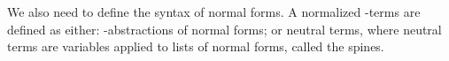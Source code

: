 \begin{code}[hide]%
\>[0]\AgdaSpace{}%
\AgdaSpace{}%
\AgdaSpace{}%
\AgdaSymbol{:}\AgdaSpace{}%
\AgdaSpace{}%
\AgdaSpace{}%
\<%
\end{code}

We also need to define the syntax of normal forms. A normalized \lambda-terms are defined as either: \lambda-abstractions of normal forms; or neutral terms, where neutral terms are variables applied to lists of normal forms, called the spines.

\begin{code}%
\>[0]\<%
\\
\>[0][@{}l@{\AgdaIndent{0}}]%
\>[2]\AgdaSpace{}%
\AgdaSpace{}%
\AgdaSymbol{:}\AgdaSpace{}%
\AgdaSpace{}%
\AgdaSpace{}%
\AgdaSpace{}%
\AgdaSpace{}%
\AgdaSpace{}%
\<%
\\
\>[2][@{}l@{\AgdaIndent{0}}]%
\>[4]\AgdaSpace{}%
\AgdaSymbol{:}\AgdaSpace{}%
\AgdaSpace{}%
\AgdaSymbol{(}\AgdaSpace{}%
\AgdaSpace{}%
\AgdaSymbol{)}\AgdaSpace{}%
\AgdaSpace{}%
\AgdaSpace{}%
\AgdaSpace{}%
\AgdaSpace{}%
\AgdaSymbol{(}\AgdaSpace{}%
\AgdaSpace{}%
\AgdaSymbol{)}\<%
\\
%
\>[4]%
\>[8]\AgdaSymbol{:}\AgdaSpace{}%
\AgdaSpace{}%
\AgdaSpace{}%
\AgdaInductiveConstructor{*}\AgdaSpace{}%
\AgdaSpace{}%
\AgdaSpace{}%
\AgdaSpace{}%
\AgdaInductiveConstructor{*}\<%
\\
%
\\[\AgdaEmptyExtraSkip]%
%
\>[2]\AgdaSpace{}%
\AgdaSpace{}%
\AgdaSymbol{:}\AgdaSpace{}%
\AgdaSpace{}%
\AgdaSpace{}%
\AgdaSpace{}%
\AgdaSpace{}%
\AgdaSpace{}%
\<%
\\
\>[2][@{}l@{\AgdaIndent{0}}]%
\>[4]\AgdaOperator{\AgdaInductiveConstructor{\AgdaUnderscore{},\AgdaUnderscore{}}}\AgdaSpace{}%

\end{code}
